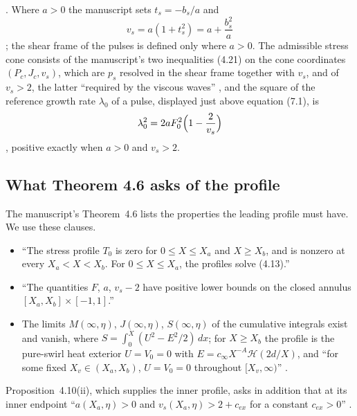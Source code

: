 \documentclass[11pt]{article}
\newcommand{\bs}{b_s}
\newcommand{\vs}{v_s}
\begin{document}
\cite[(4.14), p.~27]{OpenAINS}. Where $a>0$ the manuscript sets $t_s=-\bs/a$ and
\begin{equation}\label{eq:vs}
\vs=a(1+t_s^2)=a+\frac{\bs^2}{a}
\end{equation}
\cite[(4.20), p.~30]{OpenAINS}; the shear frame of the pulses is defined only where $a>0$. The admissible stress cone consists of the manuscript's two inequalities (4.21) on the cone coordinates $(P_c,J_c,\vs)$, which are $p_s$ resolved in the shear frame together with $\vs$, and of $\vs>2$, the latter ``required by the viscous waves'' \cite[p.~31]{OpenAINS}, and the square of the reference growth rate $\lambda_0$ of a pulse, displayed just above equation (7.1), is
\begin{equation}\label{eq:lambda0}
\lambda_0^2=2aF_0^2\Bigl(1-\frac{2}{\vs}\Bigr)
\end{equation}
\cite[p.~74]{OpenAINS}, positive exactly when $a>0$ and $\vs>2$.

\subsection{What Theorem 4.6 asks of the profile}
The manuscript's Theorem~4.6 \cite[pp.~32--34]{OpenAINS} lists the properties the leading profile must have. We use these clauses.
\begin{itemize}
\item[(ii)] ``The stress profile $T_0$ is zero for $0\le X\le X_a$ and $X\ge X_b$, and is nonzero at every $X_a<X<X_b$. For $0\le X\le X_a$, the profiles solve (4.13).'' \cite[p.~33]{OpenAINS}
\item[(iii)] ``The quantities $F$, $a$, $\vs-2$ have positive lower bounds on the closed annulus $[X_a,X_b]\times[-1,1]$.'' \cite[p.~33]{OpenAINS}
\item[(v)] The limits $M(\infty,\eta)$, $J(\infty,\eta)$, $S(\infty,\eta)$ of the cumulative integrals exist and vanish, where $S=\int_0^X(U^2-E^2/2)\,dx$; for $X\ge X_b$ the profile is the pure-swirl heat exterior $U=V_0=0$ with $E=c_\infty X^{-A}\mathcal H(2d/X)$, and ``for some fixed $X_v\in(X_a,X_b)$, $U=V_0=0$ throughout $[X_v,\infty)$'' \cite[(4.15), p.~28; (4.28)--(4.29), p.~33]{OpenAINS}.
\end{itemize}
Proposition~4.10(ii), which supplies the inner profile, asks in addition that at its inner endpoint ``$a(X_a,\eta)>0$ and $\vs(X_a,\eta)>2+c_{ex}$ for a constant $c_{ex}>0$'' \cite[p.~37]{OpenAINS}.
\end{document}
